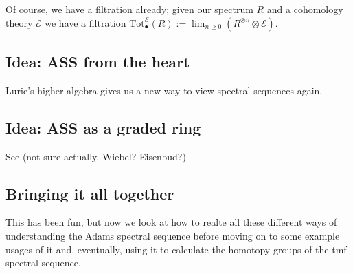 Of course, we have a filtration already; given our spectrum $R$ and a cohomology theory $\mathcal{E}$ we have a filtration $\text{Tot}_\bullet^\mathcal{E}(R) := \lim_{n\geq0} \left( R^{\otimes n} \otimes \mathcal{E} \right)$. 



\newpage
\subsection{Idea: ASS from the heart}
Lurie's higher algebra \cite{HA} gives us a new way to view spectral sequenecs again. 


\subsection{Idea: ASS as a graded ring}
See (not sure actually, Wiebel? Eisenbud?)




\subsection{Bringing it all together}
This has been fun, but now we look at how to realte all these different ways of understanding the Adams spectral sequence before moving on to some example usages of it and, eventually, using it to calculate the homotopy groups of the tmf spectral sequence. 



